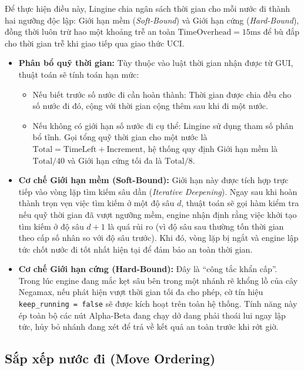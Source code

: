 Để thực hiện điều này, Lingine chia ngân sách thời gian cho mỗi nước đi thành hai ngưỡng độc lập: Giới hạn mềm (\textit{Soft-Bound}) và Giới hạn cứng (\textit{Hard-Bound}), đồng thời luôn trừ hao một khoảng trễ an toàn $\text{TimeOverhead} = 15\text{ms}$ để bù đắp cho thời gian trễ khi giao tiếp qua giao thức UCI.

\begin{itemize}
    \item \textbf{Phân bổ quỹ thời gian:} Tùy thuộc vào luật thời gian nhận được từ GUI, thuật toán sẽ tính toán hạn mức:
    \begin{itemize}
        \item Nếu biết trước số nước đi cần hoàn thành: Thời gian được chia đều cho số nước đi đó, cộng với thời gian cộng thêm sau khi đi một nước.
        \item Nếu không có giới hạn số nước đi cụ thể: Lingine sử dụng tham số phân bổ tĩnh. Gọi tổng quỹ thời gian cho một nước là $\text{Total} = \text{TimeLeft} + \text{Increment}$, hệ thống quy định Giới hạn mềm là $\text{Total} / 40$ và Giới hạn cứng tối đa là $\text{Total} / 8$.
    \end{itemize}
    
    \item \textbf{Cơ chế Giới hạn mềm (Soft-Bound):} Giới hạn này được tích hợp trực tiếp vào vòng lặp tìm kiếm sâu dần (\textit{Iterative Deepening}). Ngay sau khi hoàn thành trọn vẹn việc tìm kiếm ở một độ sâu $d$, thuật toán sẽ gọi hàm kiểm tra nếu quỹ thời gian đã vượt ngưỡng mềm, engine nhận định rằng việc khởi tạo tìm kiếm ở độ sâu $d+1$ là quá rủi ro (vì độ sâu sau thường tốn thời gian theo cấp số nhân so với độ sâu trước). Khi đó, vòng lặp bị ngắt và engine lập tức chốt nước đi tốt nhất hiện tại để đảm bảo an toàn thời gian.
    
    \item \textbf{Cơ chế Giới hạn cứng (Hard-Bound):} Đây là ``công tắc khẩn cấp''. Trong lúc engine đang mắc kẹt sâu bên trong một nhánh rẽ khổng lồ của cây Negamax, nếu phát hiện vượt thời gian tối đa cho phép, cờ tín hiệu \texttt{keep\_running = false} sẽ được kích hoạt trên toàn hệ thống. Tính năng này ép toàn bộ các nút Alpha-Beta đang chạy dở dang phải thoái lui ngay lập tức, hủy bỏ nhánh đang xét để trả về kết quả an toàn trước khi rớt giờ.

\end{itemize}

\subsection{Sắp xếp nước đi (Move Ordering)}

